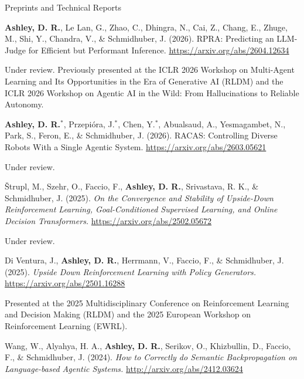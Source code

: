 \documentclass[a4paper,dateabbrev]{cv}
\begin{document}
\begin{rSection}{Preprints and Technical Reports}

\begin{rPublications}
    \item \label{pub:ashley2026rpra}
        \textbf{Ashley, D. R.}, Le Lan, G., Zhao, C., Dhingra, N., Cai, Z., Chang, E., Zhuge, M., Shi, Y., Chandra, V., \& Schmidhuber, J.
        (2026).
        RPRA: Predicting an LLM-Judge for Efficient but Performant Inference.
        \url{https://arxiv.org/abs/2604.12634}

        \nopagebreak\vspace{-0.4em}\nopagebreak
        Under review.
        Previously presented at the ICLR 2026 Workshop on Multi-Agent Learning and Its Opportunities in the Era of Generative AI (RLDM) and the ICLR 2026 Workshop on Agentic AI in the Wild: From Hallucinations to Reliable Autonomy.
    \item \label{pub:ashley2026racas}
        \textbf{Ashley, D. R.}$^*$, Przepi{\'{o}}ra, J.$^*$, Chen, Y.$^*$, Abualsaud, A., Yesmagambet, N., Park, S., Feron, E., \& Schmidhuber, J.
        (2026).
        RACAS: Controlling Diverse Robots With a Single Agentic System.
        \url{https://arxiv.org/abs/2603.05621}

        \nopagebreak\vspace{-0.4em}\nopagebreak
        Under review.
    \item \label{pub:strupl2025convergence}
        {\v{S}}trupl, M., Szehr, O., Faccio, F., \textbf{Ashley, D. R.}, Srivastava, R. K., \& Schmidhuber, J.
        (2025).
        \textit{On the Convergence and Stability of Upside-Down Reinforcement Learning, Goal-Conditioned Supervised Learning, and Online Decision Transformers.}
        \url{https://arxiv.org/abs/2502.05672}

        \nopagebreak\vspace{-0.4em}\nopagebreak
        Under review.
    \item \label{pub:ventura2025upside}
        Di Ventura, J., \textbf{Ashley, D. R.}, Herrmann, V., Faccio, F., \& Schmidhuber, J.
        (2025).
        \textit{Upside Down Reinforcement Learning with Policy Generators.}
        \url{https://arxiv.org/abs/2501.16288}

        \nopagebreak\vspace{-0.4em}\nopagebreak
        Presented at the 2025 Multidisciplinary Conference on Reinforcement Learning and Decision Making (RLDM) and the 2025 European Workshop on Reinforcement Learning (EWRL).
    \item \label{pub:wang2024how}
        Wang, W., Alyahya, H. A., \textbf{Ashley, D. R.}, Serikov, O., Khizbullin, D., Faccio, F., \& Schmidhuber, J.
        (2024).
        \textit{How to Correctly do Semantic Backpropagation on Language-based Agentic Systems.}
        \url{http://arxiv.org/abs/2412.03624}


\end{rPublications}
\end{rSection}
\end{document}
